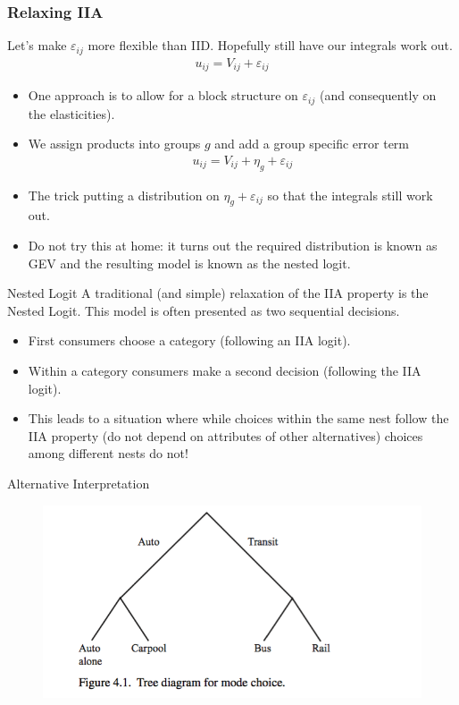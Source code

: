 \begin{frame}
\frametitle{Relaxing IIA}
Let's make $\varepsilon_{ij}$ more flexible than IID. Hopefully still have our integrals work out.
\begin{eqnarray*}
u_{ij} =   V_{ij}   + \varepsilon_{ij}
\end{eqnarray*}
\begin{itemize}
\item One approach is to allow for a block structure on $\varepsilon_{ij}$ (and consequently on the elasticities).
\item We assign products into groups $g$ and add a group specific error term
\begin{eqnarray*}
u_{ij} =   V_{ij}  + \eta_{g} + \varepsilon_{ij}
\end{eqnarray*}
\item The trick putting a distribution on $\eta_g + \varepsilon_{ij}$ so that the integrals still work out.
\item Do not try this at home: it turns out the required distribution is known as \alert{GEV} and the resulting model is known as the \alert{nested logit}.
\end{itemize}
\end{frame}

\begin{frame}{Nested Logit}
A traditional (and simple) relaxation of the IIA property is the Nested Logit. This model is often presented as two sequential decisions.
\begin{itemize}
\item First consumers choose a category (following an IIA logit).
\item Within a category consumers make a second decision (following the IIA logit).
\item This leads to a situation where while choices within the same nest follow the IIA property (do not depend on attributes of other alternatives) choices among different nests do not!
\end{itemize}
\end{frame}

\begin{frame}{Alternative Interpretation}
\begin{figure}[htbp]
\begin{center}
\includegraphics[width=5in]{resources_2/nesting.png}
\end{center}
\end{figure}
\end{frame}

